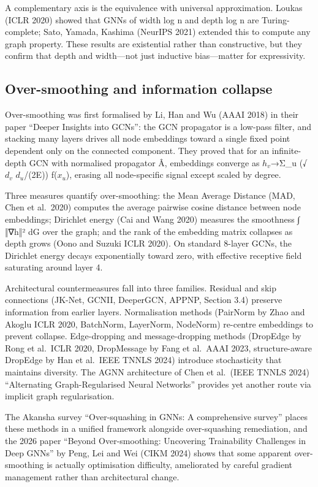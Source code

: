 \documentclass{article}
\begin{document}
A complementary axis is the equivalence with universal approximation. Loukas (ICLR 2020) showed that GNNs of width log n and depth log n are Turing-complete; Sato, Yamada, Kashima (NeurIPS 2021) extended this to compute any graph property. These results are existential rather than constructive, but they confirm that depth and width---not just inductive bias---matter for expressivity.

\subsection{Over-smoothing and information collapse}\label{over-smoothing-and-information-collapse}

Over-smoothing was first formalised by Li, Han and Wu (AAAI 2018) in their paper ``Deeper Insights into GCNs'': the GCN propagator is a low-pass filter, and stacking many layers drives all node embeddings toward a single fixed point dependent only on the connected component. They proved that for an infinite-depth GCN with normalised propagator Â, embeddings converge as \(h_v\)→Σ\_u (√\(d_v\) \(d_u\)/(2\textbar E\textbar)) f(\(x_u\)), erasing all node-specific signal except scaled by degree.

Three measures quantify over-smoothing: the Mean Average Distance (MAD, Chen et al.~2020) computes the average pairwise cosine distance between node embeddings; Dirichlet energy (Cai and Wang 2020) measures the smoothness ∫ ‖∇h‖² dG over the graph; and the rank of the embedding matrix collapses as depth grows (Oono and Suzuki ICLR 2020). On standard 8-layer GCNs, the Dirichlet energy decays exponentially toward zero, with effective receptive field saturating around layer 4.

Architectural countermeasures fall into three families. Residual and skip connections (JK-Net, GCNII, DeeperGCN, APPNP, Section 3.4) preserve information from earlier layers. Normalisation methods (PairNorm by Zhao and Akoglu ICLR 2020, BatchNorm, LayerNorm, NodeNorm) re-centre embeddings to prevent collapse. Edge-dropping and message-dropping methods (DropEdge by Rong et al.~ICLR 2020, DropMessage by Fang et al.~AAAI 2023, structure-aware DropEdge by Han et al.~IEEE TNNLS 2024) introduce stochasticity that maintains diversity. The AGNN architecture of Chen et al.~(IEEE TNNLS 2024) ``Alternating Graph-Regularised Neural Networks'' provides yet another route via implicit graph regularisation.

The Akansha \citet{akansha2025oversquashingingra} survey ``Over-squashing in GNNs: A comprehensive survey'' places these methods in a unified framework alongside over-squashing remediation, and the 2026 paper ``Beyond Over-smoothing: Uncovering Trainability Challenges in Deep GNNs'' by Peng, Lei and Wei (CIKM 2024) shows that some apparent over-smoothing is actually optimisation difficulty, ameliorated by careful gradient management rather than architectural change.
\end{document}
